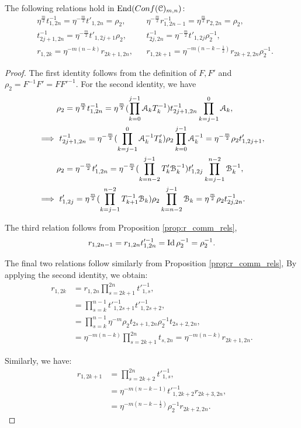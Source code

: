 \documentclass{amsart}
\begin{document}
\begin{lem}\label{lem:rho_2tr_rels}
The following relations hold in $\operatorname{End}(Conf({\mathcal{C}})_{m,n})$:
\begin{align*}
 &\eta^{\frac{m}{2}}t^{-1}_{1,2n}=\eta^{-\frac{m}{2}}t'_{1,2n}=\rho_2, &&\eta^{-\frac{m}{2}}r^{-1}_{1,2n-1}=\eta^{\frac{m}{2}}r_{2,2n}=\rho_2, \\
 &t^{-1}_{2j+1,2n}=\eta^{-\frac{m}{2}}t'_{1,2j+1}\rho_2,
 &&t^{-1}_{2j,2n}=\eta^{-\frac{m}{2}}t'_{1,2j}\rho^{-1}_2,\\
 &r_{1,2k}=\eta^{-m(n-k)}r_{2k+1,2n},
 &&r_{1,2k+1}=\eta^{-m(n-k-\frac{1}{2})}r_{2k+2,2n}\rho^{-1}_2.
\end{align*}
\end{lem}
\begin{proof}
The first identity follows from the definition of $F,F'$ and $\rho_2=F^{-1}F'=FF'^{-1}$. For the second identity, we have
\[
\begin{aligned}
 &\rho_2=\eta^{\frac{m}{2}}t^{-1}_{1,2n}=\eta^{\frac{m}{2}}(\prod^{j-1}_{k=0}\AA_kT^{-1}_k)t^{-1}_{2j+1,2n}\prod^{0}_{k=j-1}\AA_k,\\ 
 \implies&\ t^{-1}_{2j+1,2n}=\eta^{-\frac{m}{2}}(\prod^{0}_{k=j-1}\AA^{-1}_kT'_k)\rho_2\prod^{j-1}_{k=0}\AA^{-1}_k=\eta^{-\frac{m}{2}}\rho_2t'_{1,2j+1},\\
 &\rho_2=\eta^{-\frac{m}{2}}t'_{1,2n}=\eta^{-\frac{m}{2}}(\prod^{j-1}_{k=n-2}T'_k\BB^{-1}_k)t'_{1,2j}\prod^{n-2}_{k=j-1}\BB^{-1}_k,\\
 \implies&\ t'_{1,2j}=\eta^{\frac{m}{2}}(\prod^{n-2}_{k=j-1}T^{-1}_{k+1}\BB_k)\rho_2\prod^{j-1}_{k=n-2}\BB_k=\eta^{\frac{m}{2}}\rho_2t^{-1}_{2j,2n}.
\end{aligned}
\]

The third relation follows from Proposition \ref{prop:r_comm_rels}, 
\[
r_{1,2n-1}=r_{1,2n}t'^{-1}_{1,2n}=\operatorname{Id}\rho_2^{-1}=\rho_2^{-1}.
\]

The final two relations follow similarly from Proposition \ref{prop:r_comm_rels}, By applying the second identity, we obtain:
\[
\begin{aligned}
r_{1,2k}&=r_{1,2n}\prod^{2n}_{s=2k+1}t'^{-1}_{1,s},\\
&=\prod^{n-1}_{s=k}t'^{-1}_{1,2s+1}t'^{-1}_{1,2s+2},\\
&=\prod^{n-1}_{s=k}\eta^{-m}\rho_2t_{2s+1,2n}\rho^{-1}_2t_{2s+2,2n},\\
&=\eta^{-m(n-k)}\prod^{2n}_{s=2k+1}t_{s,2n}=\eta^{-m(n-k)}r_{2k+1,2n}.
\end{aligned}
\]

Similarly, we have: 
\[
\begin{aligned}
 r_{1,2k+1}&=\prod^{2n}_{s=2k+2}t'^{-1}_{1,s},\\
 &=\eta^{-m(n-k-1)}t'^{-1}_{1,2k+2}r_{2k+3,2n},\\
 &=\eta^{-m(n-k-\frac{1}{2})}\rho^{-1}_2r_{2k+2,2n}.
\end{aligned}
\]
\end{proof}
\end{document}
